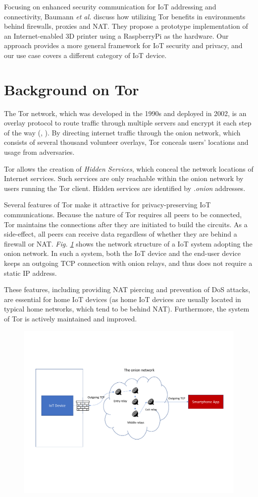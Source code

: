 Focusing on enhanced security communication for IoT addressing and connectivity, Baumann \textit{et al.} \cite{baumann2018utilising} discuss how utilizing Tor benefits in environments behind firewalls, proxies and NAT. They propose a prototype implementation of an Internet-enabled 3D printer using a RaspberryPi as the hardware. Our approach provides a more general framework for IoT security and privacy, and our use case covers a different category of IoT device.

\section{Background on Tor}
\label{sec:torbackground}
The Tor network, which was developed in the 1990s and deployed in 2002, is an overlay protocol to route traffic through multiple servers and encrypt it each step of the way (\cite{torproject}, \cite{chaabane2010digging}). By directing internet traffic through the onion network, which consists of several thousand volunteer overlays, Tor conceals users' locations and usage from adversaries.

Tor allows the creation of \textit{Hidden Services}, which conceal the network locations of Internet services. Such services are only reachable within the onion network by users running the Tor client. Hidden services are identified by \textit{.onion} addresses.

Several features of Tor make it attractive for privacy-preserving IoT communications. Because the nature of Tor requires all peers to be connected, Tor maintains the connections after they are initiated to build the circuits. As a side-effect, all peers can receive data regardless of whether they are behind a firewall or NAT. \textit{Fig. \ref{fig:natpiercing}} shows the network structure of a IoT system adopting the onion network. In such a system, both the IoT device and the end-user device keeps an outgoing TCP connection with onion relays, and thus does not require a static IP address.

These features, including providing NAT piercing and prevention of DoS attacks, are essential for home IoT devices (as home IoT devices are usually located in typical home networks, which tend to be behind NAT). Furthermore, the system of Tor is actively maintained and improved.

\begin{figure}
	\includegraphics[width=\linewidth]{natpiercing.pdf}
	\caption{}
	\label{fig:natpiercing}
\end{figure}